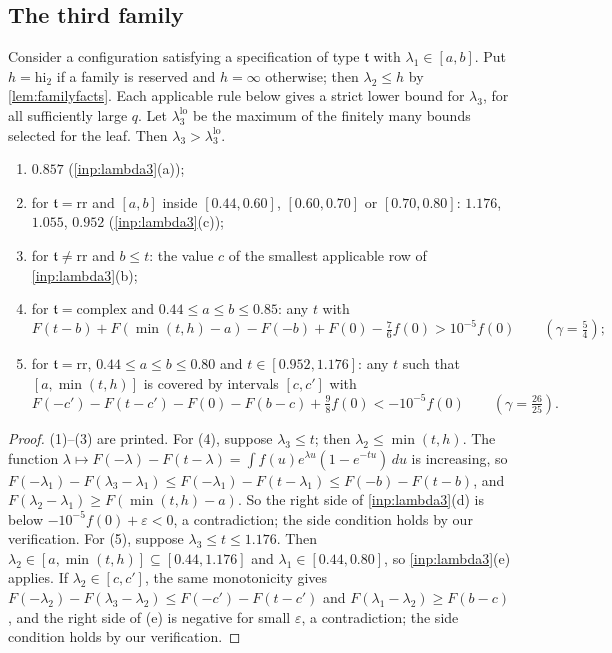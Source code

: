 \documentclass[11pt]{amsart}
\numberwithin{equation}{section}
\theoremstyle{plain}
\theoremstyle{definition}
\theoremstyle{remark}
\newcommand{\eps}{\varepsilon}
\newcommand{\lo}{\mathrm{lo}}
\newcommand{\hi}{\mathrm{hi}}
\newcommand{\1}{\mathbf{1}}
\begin{document}
\subsection{The third family}

\begin{proposition}\label{prop:third}
Consider a configuration satisfying a specification of type $\mathfrak t$ with
$\lambda_1\in[a,b]$. Put $h=\hi_2$ if a family is reserved and $h=\infty$ otherwise;
then $\lambda_2\le h$ by \cref{lem:familyfacts}.
Each applicable rule below gives a strict lower bound for $\lambda_3$, for all
sufficiently large $q$. Let $\lambda_3^{\lo}$ be the maximum of the finitely many bounds
selected for the leaf. Then $\lambda_3>\lambda_3^{\lo}$.
\begin{enumerate}[(1)]
  \item $0.857$ (\cref{inp:lambda3}(a));
  \item for $\mathfrak t=\mathrm{rr}$ and $[a,b]$ inside $[0.44,0.60]$, $[0.60,0.70]$ or $[0.70,0.80]$: $1.176$,
    $1.055$, $0.952$ (\cref{inp:lambda3}(c));
  \item for $\mathfrak t\ne\mathrm{rr}$ and $b\le t$: the value $c$ of the smallest applicable row of
    \cref{inp:lambda3}(b);
  \item for $\mathfrak t=\mathrm{complex}$ and $0.44\le a\le b\le0.85$: any $t$ with
    \[
      F(t-b)+F(\min(t,h)-a)-F(-b)+F(0)-\tfrac76f(0)>10^{-5}f(0)\qquad(\gamma=\tfrac54);
    \]
  \item for $\mathfrak t=\mathrm{rr}$, $0.44\le a\le b\le0.80$ and $t\in[0.952,1.176]$: any $t$ such that
    $[a,\min(t,h)]$ is covered by intervals $[c,c']$ with
    \[
      F(-c')-F(t-c')-F(0)-F(b-c)+\tfrac98f(0)<-10^{-5}f(0)\qquad(\gamma=\tfrac{26}{25}).
    \]
\end{enumerate}
\end{proposition}

\begin{proof}
(1)--(3) are printed. For (4), suppose $\lambda_3\le t$; then $\lambda_2\le\min(t,h)$. The function
$\lambda\mapsto F(-\lambda)-F(t-\lambda)=\int f(u)e^{\lambda u}(1-e^{-tu})\,du$ is increasing, so
$F(-\lambda_1)-F(\lambda_3-\lambda_1)\le F(-\lambda_1)-F(t-\lambda_1)\le F(-b)-F(t-b)$, and
$F(\lambda_2-\lambda_1)\ge F(\min(t,h)-a)$. So the right side of \cref{inp:lambda3}(d) is below
$-10^{-5}f(0)+\eps<0$, a contradiction; the side condition \cite[(4.29)]{Xylouris2011nullstellen} holds by our verification. For (5),
suppose $\lambda_3\le t\le1.176$. Then $\lambda_2\in[a,\min(t,h)]\subseteq[0.44,1.176]$ and
$\lambda_1\in[0.44,0.80]$, so \cref{inp:lambda3}(e) applies. If $\lambda_2\in[c,c']$, the same monotonicity gives
$F(-\lambda_2)-F(\lambda_3-\lambda_2)\le F(-c')-F(t-c')$ and $F(\lambda_1-\lambda_2)\ge F(b-c)$, and the right side of
(e) is negative for small $\eps$, a contradiction; the side condition \cite[(4.34)]{Xylouris2011nullstellen} holds
by our verification.
\end{proof}
\end{document}
